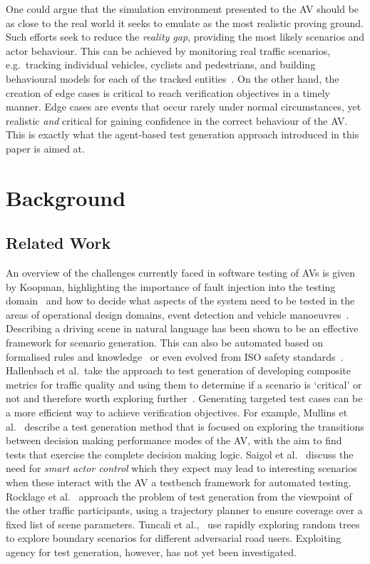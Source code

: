 \documentclass[runningheads,a4paper]{llncs}
\begin{document}
One could argue that the simulation environment presented to the AV should be as close to the real world it seeks to emulate as the most realistic proving ground. Such efforts seek to reduce the \textit{reality gap}, %
providing the most likely scenarios and actor behaviour. This can be achieved by monitoring real traffic scenarios, e.g.\ tracking individual vehicles, cyclists and pedestrians, and building behavioural models for each of the tracked entities~\cite{behbahani2019learning}.
%
On the other hand, the creation of edge cases is critical to reach verification objectives in a timely manner. Edge cases are events that occur rarely under normal circumstances, yet realistic \textit{and\/} critical for gaining confidence in the correct behaviour of the AV.
%
This is exactly what the agent-based test generation approach introduced in this paper is aimed at.  


\section{Background}\label{s:background}
\subsection{Related Work}

An overview of the challenges currently faced in software testing of AVs is given by Koopman, highlighting the importance of fault injection into the testing domain~\cite{Koopman2016} and how to decide what aspects of the system need to be tested in the areas of operational design domains, event detection and vehicle manoeuvres~\cite{Koopman2019}. 
%
Describing a driving scene in natural language has been shown to be an effective framework for scenario generation. This can also be automated based on formalised rules and knowledge~\cite{Bagschik2018} or even evolved from ISO safety standards~\cite{Menzel2018}. 
%
Hallenbach et al.\ take the approach to test generation of developing composite metrics for traffic quality and using them to determine if a scenario is `critical' or not and therefore worth exploring further~\cite{Hallerbach2018}. 
%
Generating targeted test cases can be a more efficient way to achieve verification objectives. 
%
For example, Mullins et al.~\cite{Mullins2018} describe a test generation method that is focused on exploring the transitions between decision making performance modes of the AV, with the aim to find tests that exercise the complete decision making logic. 
%
Saigol et al.~\cite{Saigol2018} discuss the need for \textit{smart actor control} which they expect may lead to interesting scenarios when these interact with the AV a testbench framework for automated testing. 
%
Rocklage et al.~\cite{Rocklage2017} approach the problem of test generation from the viewpoint of the other traffic participants, using a trajectory planner to ensure coverage over a fixed list of scene parameters. 
%
Tuncali et al.,~\cite{Tuncali2019} use rapidly exploring random trees to explore boundary scenarios for different adversarial road users.
%
Exploiting agency for test generation, however, has not yet been investigated. 
\end{document}

